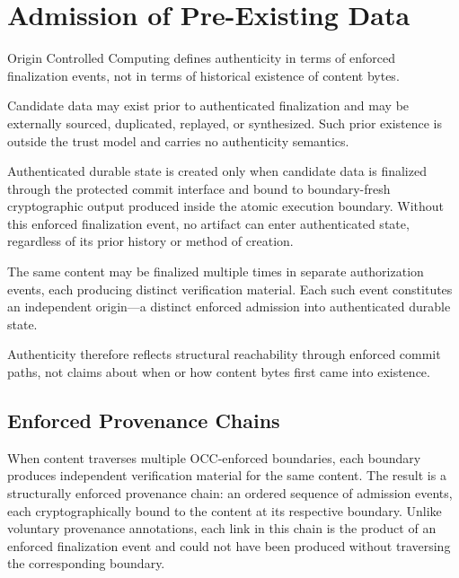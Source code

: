 \documentclass[11pt,letterpaper]{article}
\theoremstyle{occplain}
\theoremstyle{occremark}
\begin{document}
\section{Admission of Pre-Existing Data}
\label{sec:admission}

Origin Controlled Computing defines authenticity in terms of enforced finalization events, not in terms of historical existence of content bytes.

Candidate data may exist prior to authenticated finalization and may be externally sourced, duplicated, replayed, or synthesized. Such prior existence is outside the trust model and carries no authenticity semantics.

Authenticated durable state is created only when candidate data is finalized through the protected commit interface and bound to boundary-fresh cryptographic output produced inside the atomic execution boundary. Without this enforced finalization event, no artifact can enter authenticated state, regardless of its prior history or method of creation.

The same content may be finalized multiple times in separate authorization events, each producing distinct verification material. Each such event constitutes an independent origin---a distinct enforced admission into authenticated durable state.

Authenticity therefore reflects structural reachability through enforced commit paths, not claims about when or how content bytes first came into existence.


\subsection{Enforced Provenance Chains}
\label{sec:provenance-chains}

When content traverses multiple OCC-enforced boundaries, each boundary produces independent verification material for the same content. The result is a structurally enforced provenance chain: an ordered sequence of admission events, each cryptographically bound to the content at its respective boundary. Unlike voluntary provenance annotations, each link in this chain is the product of an enforced finalization event and could not have been produced without traversing the corresponding boundary.
\end{document}
